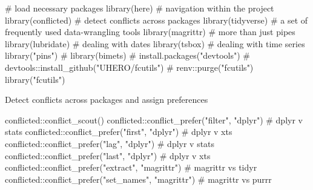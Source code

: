 \documentclass[
  letterpaper,
  DIV=11,
  numbers=noendperiod]{scrreport}
\newenvironment{Shaded}{\begin{snugshade}}{\end{snugshade}}
\newcommand{\CommentTok}[1]{\textcolor[rgb]{0.37,0.37,0.37}{#1}}
\newcommand{\FunctionTok}[1]{\textcolor[rgb]{0.28,0.35,0.67}{#1}}
\newcommand{\NormalTok}[1]{\textcolor[rgb]{0.00,0.23,0.31}{#1}}
\newcommand{\SpecialCharTok}[1]{\textcolor[rgb]{0.37,0.37,0.37}{#1}}
\newcommand{\StringTok}[1]{\textcolor[rgb]{0.13,0.47,0.30}{#1}}
\begin{document}
\begin{Shaded}
\begin{Highlighting}[]
\CommentTok{\# load necessary packages}
\FunctionTok{library}\NormalTok{(here) }\CommentTok{\# navigation within the project}
\FunctionTok{library}\NormalTok{(conflicted) }\CommentTok{\# detect conflicts across packages}
\FunctionTok{library}\NormalTok{(tidyverse) }\CommentTok{\# a set of frequently used data{-}wrangling tools}
\FunctionTok{library}\NormalTok{(magrittr) }\CommentTok{\# more than just pipes}
\FunctionTok{library}\NormalTok{(lubridate) }\CommentTok{\# dealing with dates}
\FunctionTok{library}\NormalTok{(tsbox) }\CommentTok{\# dealing with time series}
\FunctionTok{library}\NormalTok{(}\StringTok{"pins"}\NormalTok{)}
\CommentTok{\# library(bimets)}
\CommentTok{\# install.packages("devtools")}
\CommentTok{\# devtools::install\_github("UHERO/fcutils")}
\CommentTok{\# renv::purge("fcutils")}
\FunctionTok{library}\NormalTok{(}\StringTok{"fcutils"}\NormalTok{)}
\end{Highlighting}
\end{Shaded}

Detect conflicts across packages and assign preferences

\begin{Shaded}
\begin{Highlighting}[]
\NormalTok{conflicted}\SpecialCharTok{::}\FunctionTok{conflict\_scout}\NormalTok{()}
\NormalTok{conflicted}\SpecialCharTok{::}\FunctionTok{conflict\_prefer}\NormalTok{(}\StringTok{"filter"}\NormalTok{, }\StringTok{"dplyr"}\NormalTok{) }\CommentTok{\# dplyr v stats}
\NormalTok{conflicted}\SpecialCharTok{::}\FunctionTok{conflict\_prefer}\NormalTok{(}\StringTok{"first"}\NormalTok{, }\StringTok{"dplyr"}\NormalTok{) }\CommentTok{\# dplyr v xts}
\NormalTok{conflicted}\SpecialCharTok{::}\FunctionTok{conflict\_prefer}\NormalTok{(}\StringTok{"lag"}\NormalTok{, }\StringTok{"dplyr"}\NormalTok{) }\CommentTok{\# dplyr v stats}
\NormalTok{conflicted}\SpecialCharTok{::}\FunctionTok{conflict\_prefer}\NormalTok{(}\StringTok{"last"}\NormalTok{, }\StringTok{"dplyr"}\NormalTok{) }\CommentTok{\# dplyr v xts}
\NormalTok{conflicted}\SpecialCharTok{::}\FunctionTok{conflict\_prefer}\NormalTok{(}\StringTok{"extract"}\NormalTok{, }\StringTok{"magrittr"}\NormalTok{) }\CommentTok{\# magrittr vs tidyr}
\NormalTok{conflicted}\SpecialCharTok{::}\FunctionTok{conflict\_prefer}\NormalTok{(}\StringTok{"set\_names"}\NormalTok{, }\StringTok{"magrittr"}\NormalTok{) }\CommentTok{\# magrittr vs purrr}
\end{Highlighting}
\end{Shaded}
\end{document}

